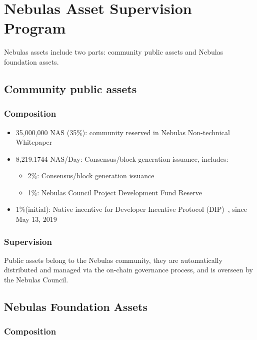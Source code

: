 \section{Nebulas Asset Supervision Program}

Nebulas assets include two parts: community public assets and Nebulas foundation assets.

\subsection{Community public assets}

\subsubsection{Composition}

\begin{itemize}
	\item 35,000,000 NAS (35\%): community reserved in Nebulas Non-technical Whitepaper
    \item 8,219.1744 NAS/Day: Consensus/block generation issuance, includes:
	    \begin{itemize}
			\item 2\%: Consensus/block generation issuance
			\item 1\%: Nebulas Council Project Development Fund Reserve
		\end{itemize}
	\item 1\%(initial): Native incentive for Developer Incentive Protocol (DIP)~\cite{mauvepaper}, since May 13, 2019
\end{itemize}

\subsubsection{Supervision}

Public assets belong to the Nebulas community, they are automatically distributed and managed via the on-chain governance process, and is overseen by the Nebulas Council.

\subsection{Nebulas Foundation Assets}

\subsubsection{Composition}

